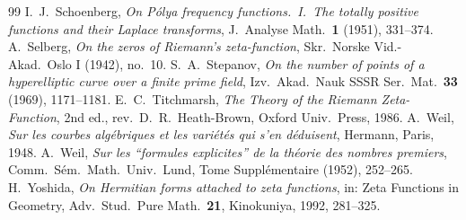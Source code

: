 \documentclass[11pt]{amsart}
\theoremstyle{definition}
\theoremstyle{remark}
\begin{document}
\begin{thebibliography}{99}
 I.~J.~Schoenberg, \emph{On P\'olya frequency functions.\ I.\ The totally positive functions and their Laplace transforms}, J.\ Analyse Math.\ \textbf{1} (1951), 331--374.
 A.~Selberg, \emph{On the zeros of Riemann's zeta-function}, Skr.\ Norske Vid.-Akad.\ Oslo I (1942), no.~10.
 S.~A.~Stepanov, \emph{On the number of points of a hyperelliptic curve over a finite prime field}, Izv.\ Akad.\ Nauk SSSR Ser.\ Mat.\ \textbf{33} (1969), 1171--1181.
 E.~C.~Titchmarsh, \emph{The Theory of the Riemann Zeta-Function}, 2nd ed., rev.\ D.~R.~Heath-Brown, Oxford Univ.\ Press, 1986.
 A.~Weil, \emph{Sur les courbes alg\'ebriques et les vari\'et\'es qui s'en d\'eduisent}, Hermann, Paris, 1948.
 A.~Weil, \emph{Sur les ``formules explicites'' de la th\'eorie des nombres premiers}, Comm.\ S\'em.\ Math.\ Univ.\ Lund, Tome Suppl\'ementaire (1952), 252--265.
 H.~Yoshida, \emph{On Hermitian forms attached to zeta functions}, in: Zeta Functions in Geometry, Adv.\ Stud.\ Pure Math.\ \textbf{21}, Kinokuniya, 1992, 281--325.
\end{thebibliography}
\end{document}

